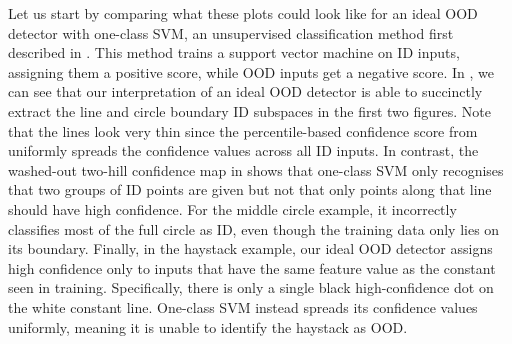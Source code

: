 \noindent Let us start by comparing what these plots could look like for an ideal OOD detector with one-class SVM, an unsupervised classification method first described in \textcite{ood-svm-1999}. This method trains a support vector machine on ID inputs, assigning them a positive score, while OOD inputs get a negative score. In , we can see that our interpretation of an ideal OOD detector is able to succinctly extract the line and circle boundary ID subspaces in the first two figures. Note that the lines look very thin since the percentile-based confidence score from  uniformly spreads the confidence values across all ID inputs. In contrast, the washed-out two-hill confidence map in  shows that one-class SVM only recognises that two groups of ID points are given but not that only points along that line should have high confidence. For the middle circle example, it incorrectly classifies most of the full circle as ID, even though the training data only lies on its boundary. Finally, in the haystack example, our ideal OOD detector assigns high confidence only to inputs that have the same feature value as the constant seen in training. Specifically, there is only a single black high-confidence dot on the white constant line. One-class SVM instead spreads its confidence values uniformly, meaning it is unable to identify the haystack as OOD.

